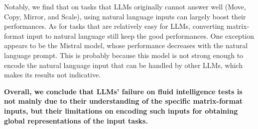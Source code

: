 Notably, we find that on tasks that LLMs originally cannot answer well (Move, Copy, Mirror, and Scale), using natural language inputs can largely boost their performances. As for tasks that are relatively easy for LLMs, converting matrix-format input to natural language still keep the good performances. %
One exception appears to be the Mistral model, whose performance decreases with the natural language prompt. This is probably because this model is not strong enough to encode the natural language input that can be handled by other LLMs, which makes its results not indicative.

\textbf{Overall, we conclude that LLMs' failure on fluid intelligence tests is not mainly due to their understanding of the specific matrix-format inputs, but their limitations on encoding such inputs for obtaining global representations of the input tasks.}









